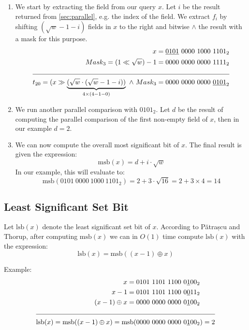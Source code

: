 \begin{enumerate}
    \item
    We start by extracting the field from our query $x$. Let $i$ be the result returned from \ref{sec:parallel}, e.g. the index of the field. We extract $f_i$ by shifting $(\sqrt{w} - 1 - i)$ fields in $x$ to the right and bitwise $\wedge$ the result with a mask for this purpose.
    \begin{align*}
        x = \underline{0101}\ 0000\ 1000\ 1101_2 &\\
        Mask_3 = (1 \ll \sqrt{w}) - 1 = 0000\ 0000\ 0000\ 1111_2 &\\
        \cline{1-2}
        t_{20} = (x \gg \underbrace{(\sqrt{w} \cdot (\sqrt{w} - 1 - i))}_{4\times(4-1-0)}\ \wedge\ Mask_3 = 0000\ 0000\ 0000\ \underline{0101}_2 &
    \end{align*}
    \item
    We run another parallel comparison with $0101_2$. Let $d$ be the result of computing the parallel comparison of the first non-empty field of $x$, then in our example $d = 2$.
    \item
    We can now compute the overall most significant bit of $x$. The final result is given the expression:
    \begin{equation*}
        \text{msb}(x) = d + i\cdot\sqrt{w}
    \end{equation*}
    In our example, this will evaluate to:
    \begin{equation*}
        \text{msb}(0101\ 0000\ 1000\ 1101_2) = 2 + 3\cdot\sqrt{16} = 2 + 3 \times 4 = 14
    \end{equation*}
\end{enumerate}

\newpage
\subsection{Least Significant Set Bit} \label{sec:lsbAlgorithm}

Let $\text{lsb}(x)$ denote the least significant set bit of $x$. According to Pătrașcu and Thorup, after computing $\text{msb}(x)$ we can in $O(1)$ time compute $\text{lsb}(x)$ with the expression:
\begin{equation*}
    \text{lsb}(x) = \text{msb}((x - 1) \oplus x)
\end{equation*}

Example:
\begin{align*}
    x = 0101\ 1101\ 1100\ 0\underline{1}00_2& \\
    x - 1 = 0101\ 1101\ 1100\ 0\underline{0}11_2& \\
    (x - 1) \oplus x = 0000\ 0000\ 0000\ 0\underline{1}00_2& \\
    \cline{1-2}
    \text{lsb}(x) = \text{msb}((x - 1) \oplus x) = \text{msb}(0000\ 0000\ 0000\ 0\underline{1}00_2&) = 2
\end{align*}

